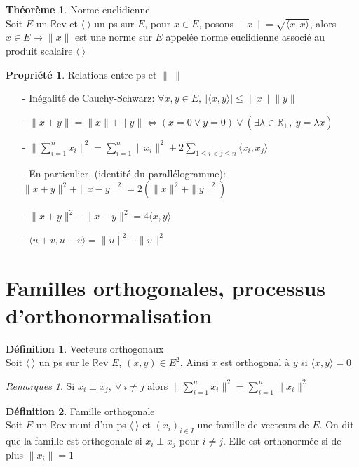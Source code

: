 \documentclass[fleqn]{article}
\theoremstyle{definition} \newtheorem*{defi}{D\'efinition}
\theoremstyle{definition} \newtheorem*{theo}{Th\'eor\`eme}
\theoremstyle{definition} \newtheorem*{coro}{Corollaire}
\theoremstyle{remark} \newtheorem*{rqs}{Remarques}
\theoremstyle{definition} \newtheorem*{prop}{Propri\'et\'e}
\begin{document}
\begin{theo}  Norme euclidienne \\
	Soit $E$ un $\mathbb{R}$ev et $\langle\ \rangle$ un ps sur $E$, pour $x \in E$, posons \mbox{$\|x\| = \sqrt{\langle x,x \rangle}$}, alors $x \in E
	\mapsto \|x\|$ est une norme sur $E$ appel\'ee norme euclidienne associ\'e au produit scalaire $\langle\ \rangle$
\end{theo}

\begin{prop} Relations entre ps et $\| \ \|$
	\begin{enumerate}
		\item [-] In\'egalit\'e de Cauchy-Schwarz: $\forall x,y \in E,\ |\langle x,y \rangle| \leq \|x\| \|y\|$
		\item [-] $\|x+y\| = \|x\| + \|y\| \Leftrightarrow (x=0 \lor y = 0) \lor (\exists \lambda \in \mathbb{R}_+,\ y = \lambda x)$
		\item [-] $\|\sum_{i=1}^n x_i \| ^2 = \sum_{i=1}^n \|x_i\|^2 + 2\sum_{1 \leq i < j \leq n} \langle x_i,x_j \rangle$
		\item [-] En particulier, (identit\'e du parall\'elogramme):\\
			$\|x+y\|^2 + \|x-y\|^2 = 2(\|x\|^2 + \|y\|^2)$
		\item [-] $\|x+y\|^2 - \|x-y\|^2= 4\langle x,y \rangle$
		\item [-] $\langle u+v, u-v \rangle = \|u\|^2 - \|v\|^2$
	\end{enumerate}
\end{prop}

\section{Familles orthogonales, processus d'orthonormalisation}

\begin{defi} Vecteurs orthogonaux \\
	Soit $\langle\ \rangle$ un ps sur le $\mathbb{R}$ev $E$, $(x,y) \in E^2$. Ainsi $x$ est orthogonal \`a $y$ si $\langle x,y \rangle = 0$
	\begin{rqs} Si $x_i \perp x_j,\ \forall\ i \neq j$ alors $\|\sum_{i=1}^n x_i \|^2 = \sum_{i=1}^n \|x_i\|^2$ \end{rqs}
\end{defi}

\begin{defi} Famille orthogonale \\
	Soit $E$ un $\mathbb{R}$ev muni d'un ps $\langle\ \rangle$ et $(x_i)_{i\in I}$ une famille de vecteurs de $E$. On dit que la famille est
	orthogonale si $x_i \perp x_j$ pour $i\neq j$. Elle est orthonorm\'ee si de plus $\|x_i\| = 1$
\end{defi}
\end{document}

